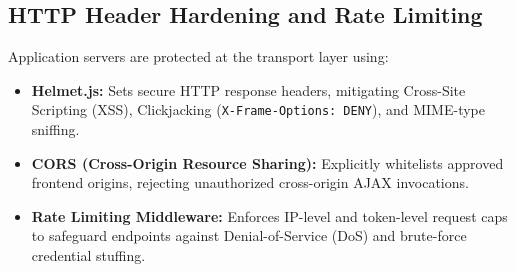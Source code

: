 \subsection{HTTP Header Hardening and Rate Limiting}
Application servers are protected at the transport layer using:
\begin{itemize}
    \item \textbf{Helmet.js:} Sets secure HTTP response headers, mitigating Cross-Site Scripting (XSS), Clickjacking (\texttt{X-Frame-Options: DENY}), and MIME-type sniffing.
    \item \textbf{CORS (Cross-Origin Resource Sharing):} Explicitly whitelists approved frontend origins, rejecting unauthorized cross-origin AJAX invocations.
    \item \textbf{Rate Limiting Middleware:} Enforces IP-level and token-level request caps to safeguard endpoints against Denial-of-Service (DoS) and brute-force credential stuffing.
\end{itemize}

